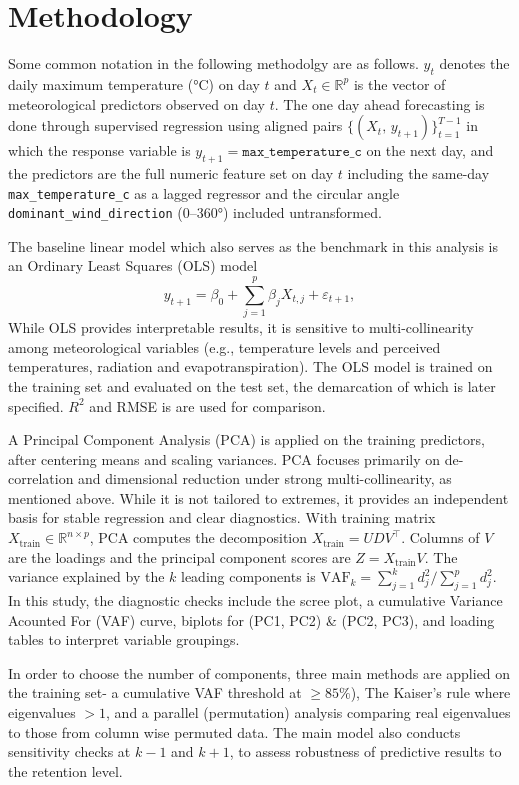 \documentclass[
]{article}
\begin{document}
\section{Methodology}\label{methodology}

Some common notation in the following methodolgy are as follows.
\(y_{t}\) denotes the daily maximum temperature (°C) on day \(t\) and
\(X_{t}\in\mathbb{R}^{p}\) is the vector of meteorological predictors
observed on day \(t\). The one day ahead forecasting is done through
supervised regression using aligned pairs
\(\{(X_{t},\,y_{t+1})\}_{t=1}^{T-1}\) in which the response variable is
\(y_{t+1}=\texttt{max\_temperature\_c}\) on the next day, and the
predictors are the full numeric feature set on day \(t\) including the
same-day \texttt{max\_temperature\_c} as a lagged regressor and the
circular angle \texttt{dominant\_wind\_direction} (0--360°) included
untransformed.

The baseline linear model which also serves as the benchmark in this
analysis is an Ordinary Least Squares (OLS) model \[
y_{t+1}=\beta_0+\sum_{j=1}^{p}\beta_j X_{t,j}+\varepsilon_{t+1},
\] While OLS provides interpretable results, it is sensitive to
multi-collinearity among meteorological variables (e.g., temperature
levels and perceived temperatures, radiation and evapotranspiration).
The OLS model is trained on the training set and evaluated on the test
set, the demarcation of which is later specified. \(R^2\) and RMSE is
are used for comparison.

A Principal Component Analysis (PCA) is applied on the training
predictors, after centering means and scaling variances. PCA focuses
primarily on de-correlation and dimensional reduction under strong
multi-collinearity, as mentioned above. While it is not tailored to
extremes, it provides an independent basis for stable regression and
clear diagnostics. With training matrix
\(X_{\text{train}}\in\mathbb{R}^{n\times p}\), PCA computes the
decomposition \(X_{\text{train}}=U D V^{\top}\). Columns of \(V\) are
the loadings and the principal component scores are
\(Z=X_{\text{train}}V\). The variance explained by the \(k\) leading
components is \(\text{VAF}_k=\sum_{j=1}^k d_j^2 / \sum_{j=1}^p d_j^2\).
In this study, the diagnostic checks include the scree plot, a
cumulative Variance Acounted For (VAF) curve, biplots for (PC1, PC2) \&
(PC2, PC3), and loading tables to interpret variable groupings.

In order to choose the number of components, three main methods are
applied on the training set- a cumulative VAF threshold at
\(\ge 85\%\)), The Kaiser's rule where eigenvalues \(>1\), and a
parallel (permutation) analysis comparing real eigenvalues to those from
column wise permuted data. The main model also conducts sensitivity
checks at \(k-1\) and \(k+1\), to assess robustness of predictive
results to the retention level.
\end{document}
